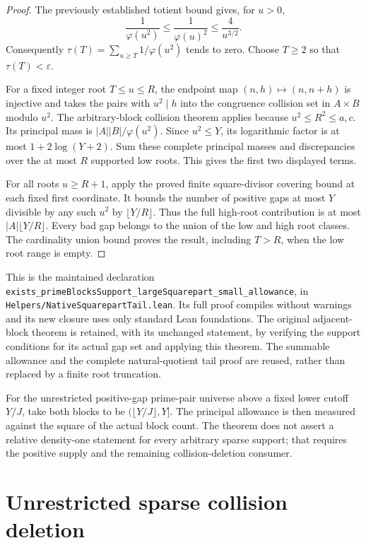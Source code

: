 \documentclass[11pt]{article}
\begin{document}
\begin{proof}
The previously established totient bound gives, for \(u>0\),
\[
 \frac1{\varphi(u^2)}
 \le\frac1{\varphi(u)^2}
 \le\frac4{u^{3/2}}.
\]
Consequently
\(\tau(T)=\sum_{u\ge T}1/\varphi(u^2)\) tends to zero.
Choose \(T\ge2\) so that \(\tau(T)<\varepsilon\).

For a fixed integer root \(T\le u\le R\), the endpoint map
\((n,h)\mapsto(n,n+h)\) is injective and takes the pairs
with \(u^2\mid h\) into the congruence collision set in
\(A\times B\) modulo \(u^2\).
The arbitrary-block collision theorem applies because
\(u^2\le R^2\le a,c\). Its principal mass is
\(|A||B|/\varphi(u^2)\).
Since \(u^2\le Y\), its logarithmic factor is at most
\(1+2\log(Y+2)\).
Sum these complete principal masses and discrepancies over
the at most \(R\) supported low roots.
This gives the first two displayed terms.

For all roots \(u\ge R+1\), apply the proved finite
square-divisor covering bound at each fixed first coordinate.
It bounds the number of positive gaps at most \(Y\) divisible
by any such \(u^2\) by \(\lfloor Y/R\rfloor\).
Thus the full high-root contribution is at most
\(|A|\lfloor Y/R\rfloor\).
Every bad gap belongs to the union of the low and high
root classes. The cardinality union bound proves the result,
including \(T>R\), when the low root range is empty.
\end{proof}

This is the maintained declaration
\texttt{exists\_primeBlocksSupport\_largeSquarepart\_small\_allowance},
in \texttt{Helpers/\allowbreak NativeSquarepartTail.\allowbreak lean}.
Its full proof compiles without warnings and its new closure
uses only standard Lean foundations.
The original adjacent-block theorem is retained, with its
unchanged statement, by verifying the support conditions for
its actual gap set and applying this theorem.
The summable allowance and the complete natural-quotient
tail proof are reused, rather than replaced by a finite
root truncation.

For the unrestricted positive-gap prime-pair universe above
a fixed lower cutoff \(Y/J\), take both blocks to be
\((\lfloor Y/J\rfloor,Y]\).
The principal allowance is then measured against the square
of the actual block count. The theorem does not assert a
relative density-one statement for every arbitrary sparse
support; that requires the positive supply and the remaining
collision-deletion consumer.

\section{Unrestricted sparse collision deletion}
\label{sec:native-unrestricted-sparse}
\end{document}
